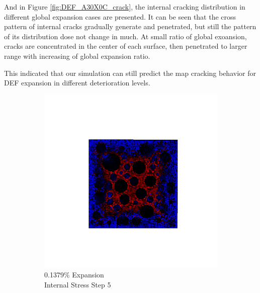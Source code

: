 And in Figure \ref{fig:DEF_A30X0C_crack}, the internal cracking distribution in different global expansion cases are presented. It can be seen that the cross pattern of internal cracks gradually generate and penetrated, but still the pattern of its distribution dose not change in much. At small ratio of global exoansion, cracks are concentrated in the center of each surface, then penetrated to larger range with increasing of global expansion ratio.

This indicated that our simulation can still predict the map cracking behavior for DEF expansion in different deterioration levels.

\begin{figure}[h!]
\centering
    \begin{subfigure}{.25\textwidth}
      \centering
      \includegraphics[width=1.0\linewidth]{Files/exp_3D/DEF/A30X0C_1_s5.png}
      \caption{0.1379\% Expansion\\Internal Stress Step 5}
    \end{subfigure}%
    \begin{subfigure}{.25\textwidth}
      \centering

\end{subfigure}
\end{figure}
